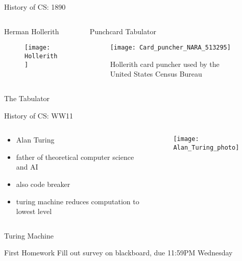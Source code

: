 \documentclass[xcolor={dvipsnames}]{beamer}
\begin{document}
\begin{frame}{History of CS: 1890}
	\begin{columns}
	 \begin{column}{.49\textwidth}
			\begin{center}Herman Hollerith\end{center}
  			\begin{figure}
 				\texttt{[image: Hollerith]}
			\end{figure}
 	\end{column}
	 \begin{column}{.49\textwidth}
		\begin{center}Punchcard Tabulator\end{center}
  		\begin{figure}
 		\texttt{[image: Card\_puncher\_NARA\_513295]}
		\caption{Hollerith card puncher used by the United States Census Bureau}
		\end{figure}
	\end{column}
\end{columns}
\end{frame}

\begin{frame}{The Tabulator}
	\begin{center}
	\href{http://channel.nationalgeographic.com/channel/the-link/videos/the-tabulator/}{\beamergotobutton{NatGeo}}
	\end{center}
\end{frame}

\begin{frame}{History of CS: WW11}
	\begin{columns}
	 \begin{column}{.49\textwidth}
			\begin{itemize}
				\item Alan Turing
				\item father of theoretical computer science and AI
				\item also code breaker
				\item turing machine reduces computation to lowest level
			\end{itemize}
 	\end{column}
	 \begin{column}{.49\textwidth}
  		\begin{figure}
 		\texttt{[image: Alan\_Turing\_photo]}
		\end{figure}
	\end{column}
\end{columns}
\end{frame}

\begin{frame}{Turing Machine}
	\begin{center}
	\end{center}
\end{frame}


\begin{frame}{First Homework}
Fill out survey on blackboard, due 11:59PM Wednesday
\end{frame}
\end{document}
